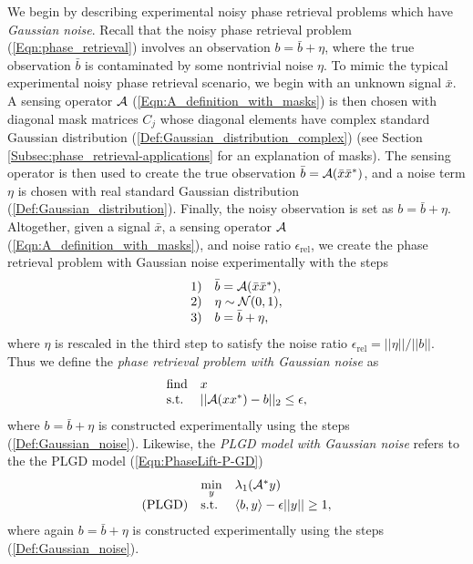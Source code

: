 We begin by describing experimental noisy phase retrieval problems which have \textit{Gaussian noise}.  Recall that the noisy phase retrieval problem (\ref{Eqn:phase_retrieval}) involves an observation $b = \bar{b} + \eta$, where the true observation $\bar{b}$ is contaminated by some nontrivial noise $\eta$.  To mimic the typical experimental noisy phase retrieval scenario, we begin with an unknown signal $\bar{x}$.  A sensing operator ${\mathcal A}$ (\ref{Eqn:A_definition_with_masks}) is then chosen with diagonal mask matrices $C_j$ whose diagonal elements have complex standard Gaussian distribution (\ref{Def:Gaussian_distribution_complex}) (see Section \ref{Subsec:phase_retrieval-applications} for an explanation of masks).  The sensing operator is then used to create the true observation $\bar{b} = {\mathcal A}(\bar{x}\bar{x}^*)$, and a noise term $\eta$ is chosen with real standard Gaussian distribution (\ref{Def:Gaussian_distribution}).  Finally, the noisy observation is set as $b = \bar{b} + \eta$.  Altogether, given a signal $\bar{x}$, a sensing operator ${\mathcal A}$ (\ref{Eqn:A_definition_with_masks}), and noise ratio $\epsilon_\text{rel}$, we create the phase retrieval problem with Gaussian noise experimentally with the steps
\begin{equation} 			\label{Def:Gaussian_noise}
\begin{array}{ll}
1)	&	\bar{b} = {\mathcal A}(\bar{x}\bar{x}^*) ,\\
2) &	\eta \sim {\mathcal N}(0,1), \\
3) & b = \bar{b} + \eta,
\end{array}
\end{equation}
where $\eta$ is rescaled in the third step to satisfy the noise ratio $\epsilon_\text{rel} = ||\eta|| / ||b||$.  Thus we define the \textit{phase retrieval problem with Gaussian noise} as
\begin{equation} \label{Eqn:phase_retrieval_Gaussian_noise}
\begin{array}{ll}
		\text{find}
		&	x
			\\
		\textnormal{s.t.}
		& 	||{\mathcal A} (xx^*) - b||_2 \leq \epsilon,
\end{array}
\end{equation}
where $b = \bar{b} + \eta$ is constructed experimentally using the steps (\ref{Def:Gaussian_noise}).  Likewise, the \textit{PLGD model with Gaussian noise} refers to the the PLGD model (\ref{Eqn:PhaseLift-P-GD}) 
\begin{equation} 			\label{Eqn:PhaseLift-GD_Gaussian_noise}
\begin{array}{lll}
	&\min\limits_{\substack{y}}
					&	\lambda_1({\mathcal A}^* y)
						\\
	\textnormal{(PLGD)}
				&	\textnormal{s.t.}
					&	\langle b, y \rangle - \epsilon ||y|| \geq 1,
\end{array}
\end{equation}
where again $b = \bar{b} + \eta$ is constructed experimentally using the steps (\ref{Def:Gaussian_noise}).  




